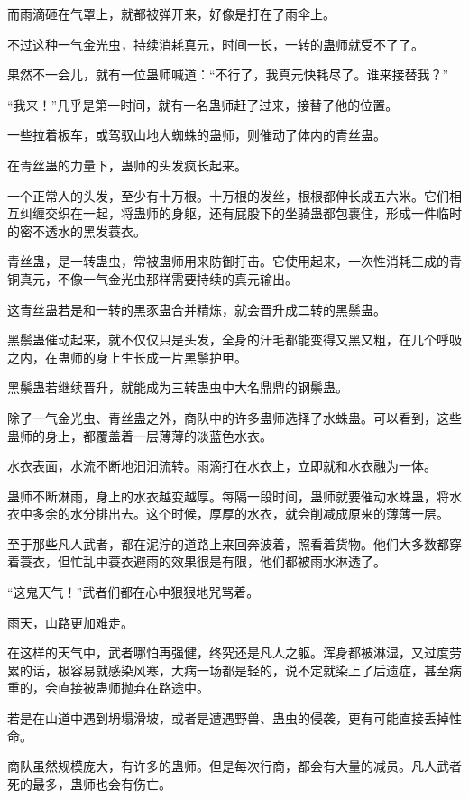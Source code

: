 \begin{this_body}
而雨滴砸在气罩上，就都被弹开来，好像是打在了雨伞上。

不过这种一气金光虫，持续消耗真元，时间一长，一转的蛊师就受不了了。

果然不一会儿，就有一位蛊师喊道：“不行了，我真元快耗尽了。谁来接替我？”

“我来！”几乎是第一时间，就有一名蛊师赶了过来，接替了他的位置。

一些拉着板车，或驾驭山地大蜘蛛的蛊师，则催动了体内的青丝蛊。

在青丝蛊的力量下，蛊师的头发疯长起来。

一个正常人的头发，至少有十万根。十万根的发丝，根根都伸长成五六米。它们相互纠缠交织在一起，将蛊师的身躯，还有屁股下的坐骑蛊都包裹住，形成一件临时的密不透水的黑发蓑衣。

青丝蛊，是一转蛊虫，常被蛊师用来防御打击。它使用起来，一次性消耗三成的青铜真元，不像一气金光虫那样需要持续的真元输出。

这青丝蛊若是和一转的黒豕蛊合并精炼，就会晋升成二转的黑鬃蛊。

黑鬃蛊催动起来，就不仅仅只是头发，全身的汗毛都能变得又黑又粗，在几个呼吸之内，在蛊师的身上生长成一片黑鬃护甲。

黑鬃蛊若继续晋升，就能成为三转蛊虫中大名鼎鼎的钢鬃蛊。

除了一气金光虫、青丝蛊之外，商队中的许多蛊师选择了水蛛蛊。可以看到，这些蛊师的身上，都覆盖着一层薄薄的淡蓝色水衣。

水衣表面，水流不断地汩汩流转。雨滴打在水衣上，立即就和水衣融为一体。

蛊师不断淋雨，身上的水衣越变越厚。每隔一段时间，蛊师就要催动水蛛蛊，将水衣中多余的水分排出去。这个时候，厚厚的水衣，就会削减成原来的薄薄一层。

至于那些凡人武者，都在泥泞的道路上来回奔波着，照看着货物。他们大多数都穿着蓑衣，但忙乱中蓑衣避雨的效果很是有限，他们都被雨水淋透了。

“这鬼天气！”武者们都在心中狠狠地咒骂着。

雨天，山路更加难走。

在这样的天气中，武者哪怕再强健，终究还是凡人之躯。浑身都被淋湿，又过度劳累的话，极容易就感染风寒，大病一场都是轻的，说不定就染上了后遗症，甚至病重的，会直接被蛊师抛弃在路途中。

若是在山道中遇到坍塌滑坡，或者是遭遇野兽、蛊虫的侵袭，更有可能直接丢掉性命。

商队虽然规模庞大，有许多的蛊师。但是每次行商，都会有大量的减员。凡人武者死的最多，蛊师也会有伤亡。


\end{this_body}

